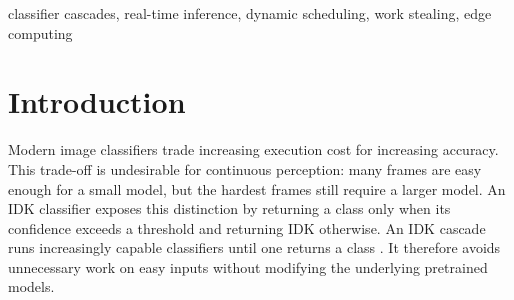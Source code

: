 
\begin{abstract}
Classifier cascades reduce average inference cost by accepting easy inputs at
small models and forwarding uncertain inputs to larger models.  Their usual
sequential execution, however, leaves processors idle and limits throughput
when inputs arrive continuously.  This paper presents a dynamic parallel IDK
(``I don't know'') cascade for image classification.  A lightweight model
handles every input first.  For an uncertain input, a learned router selects
one of two downstream models from the upstream model's confidence, entropy, and
top-two probability margin.  A scheduler coordinates model workers through an
asymmetric doubly linked queue, permits safe work stealing, and bounds the
number of in-flight inputs.  On ImageNet-V2, a Random-Forest skip decision
reduces cached sequential compute time by 5.9\% without changing top-1
accuracy at the reported precision.  In controlled cache replay, two in-flight
inputs increase throughput from 57.94 to 96.28 images/s while increasing mean
latency from 17.26 to 20.51 ms.  A live Apple-M1 implementation sustains a
30-frame/s input stream, whereas a 60-frame/s configuration is overloaded and
accumulates backlog.  These results show that learned routing and bounded
parallelism can improve average throughput, but also that admission rate and
shared-accelerator contention must be modeled explicitly for real-time use.
\end{abstract}

\begin{IEEEkeywords}
classifier cascades, real-time inference, dynamic scheduling, work stealing,
edge computing
\end{IEEEkeywords}

\section{Introduction}
\label{sec:introduction}

Modern image classifiers trade increasing execution cost for increasing
accuracy.  This trade-off is undesirable for continuous perception: many
frames are easy enough for a small model, but the hardest frames still require
a larger model.  An IDK classifier exposes this distinction by returning a
class only when its confidence exceeds a threshold and returning IDK
otherwise.  An IDK cascade runs increasingly capable classifiers until one
returns a class \cite{wang2018idk}.  It therefore avoids unnecessary work on
easy inputs without modifying the underlying pretrained models.

